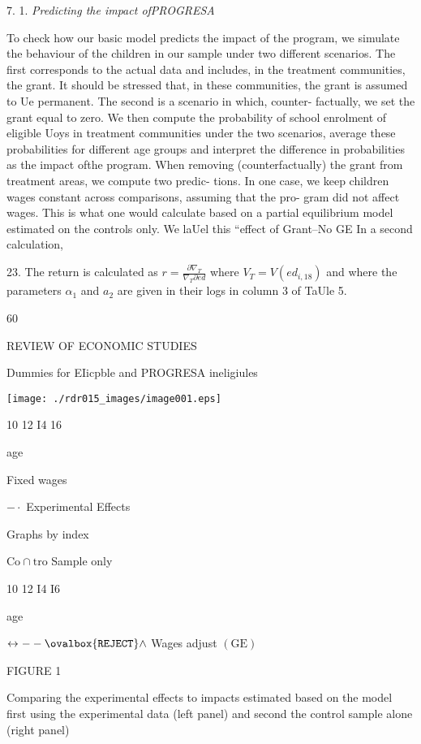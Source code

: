 7. 1. {\it Predicting the impact ofPROGRESA}

To check how our basic model predicts the impact of the program, we simulate the behaviour of the children in our sample under two different scenarios. The first corresponds to the actual data and includes, in the treatment communities, the grant. It should be stressed that, in these communities, the grant is assumed to Ue permanent. The second is a scenario in which, counter- factually, we set the grant equal to zero. We then compute the probability of school enrolment of eligible Uoys in treatment communities under the two scenarios, average these probabilities for different age groups and interpret the difference in probabilities as the impact ofthe program. When removing (counterfactually) the grant from treatment areas, we compute two predic- tions. In one case, we keep children wages constant across comparisons, assuming that the pro- gram did not affect wages. This is what one would calculate based on a partial equilibrium model estimated on the controls only. We laUel this ``effect of Grant--No GE In a second calculation,

23. The return is calculated as $r=\displaystyle \frac{\partial\nabla_{T}}{\nabla_{T}\partial ed}$ where $V_{T}=V(ed_{i,18})$ and where the parameters $\alpha_{1}$ and $a_{2}$ are given in their logs in column 3 of TaUle 5.

60

REVIEW OF ECONOMIC STUDIES

Dummies for EIicpble and PROGRESA ineligiules
\begin{center}
\texttt{[image: ./rdr015\_images/image001.eps]}
\end{center}
10 12 I4 16

age

Fixed wages

$-\cdot$ Experimental Effects

Graphs by index

$\mathrm{C}\mathrm{o}\cap \mathrm{t}\mathrm{r}\mathrm{o}$ Sample only

10 12 I4 I6

age

$\leftrightarrow--\ovalbox{\tt\small REJECT}\wedge$ Wages adjust $(\mathrm{G}\mathrm{E})$

FIGURE 1

Comparing the experimental effects to impacts estimated based on the model first using the experimental data (left panel) and second the control sample alone (right panel)

